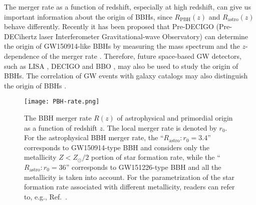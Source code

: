 The merger rate as a function of redshift, especially at high redshift, can give us important information about the origin of \acp{BBH}, since $R_\textrm{PBH}(z)$ and $R_\textrm{astro}(z)$ behave differently.
Recently it has been proposed that Pre-DECIGO (Pre-DECihertz laser Interferometer Gravitational-wave Observatory) can determine the origin of GW150914-like \acp{BBH} by measuring the mass spectrum and the $z$-dependence of the merger rate \cite{Nakamura:2016hna}.
Therefore, future space-based \ac{GW} detectors, such as LISA \cite{Heinzel:2014ets,Bartolo:2016ami}, DECIGO \cite{Kawamura:2006up} and BBO \cite{Harry:2006fi}, may also be used to study the origin of \acp{BBH}.
The correlation of \ac{GW} events with galaxy catalogs may also distinguish the origin of \acp{BBH} \cite{Raccanelli:2016cud}.

\begin{figure}[htbp]
	\centering
	\texttt{[image: PBH-rate.png]}
	\caption{The \ac{BBH} merger rate $R(z)$ of astrophysical and primordial origin as a function of redshift $z$. 
	The local merger rate is denoted by $r_0$. 
	For the astrophysical \ac{BBH} merger rate, the ``$R_\text{astro}:r_0 = 3.4$'' corresponds to GW150914-type \ac{BBH} and considers only the metallicity $Z<Z_\odot/2$ portion of star formation rate, while the ``$R_\text{astro}:r_0= 36$'' corresponds to GW151226-type \ac{BBH} and all the metallicity is taken into account.
	For the parametrization of the star formation rate associated with different metallicity, readers can refer to, e.g., Ref.~\cite{Callister:2016ewt}.}
	\label{fig:PBH-rate}
\end{figure}


